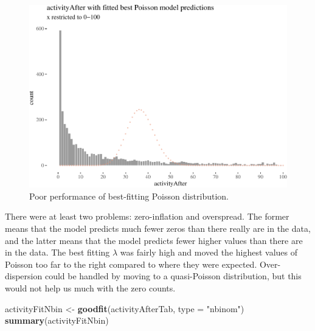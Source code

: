 \documentclass[10pt,]{scrartcl}
\newenvironment{Shaded}{\begin{snugshade}}{\end{snugshade}}
\newcommand{\KeywordTok}[1]{\textcolor[rgb]{0.13,0.29,0.53}{\textbf{#1}}}
\newcommand{\DataTypeTok}[1]{\textcolor[rgb]{0.13,0.29,0.53}{#1}}
\newcommand{\StringTok}[1]{\textcolor[rgb]{0.31,0.60,0.02}{#1}}
\newcommand{\NormalTok}[1]{#1}
\begin{document}
\normalsize

\begin{figure}

\begin{center}\includegraphics[width=1\linewidth]{redditAnalysisWalkthrough_files/figure-latex/unnamed-chunk-71-1} \end{center}
\caption{Poor performance of best-fitting Poisson distribution.}
\end{figure}

There were at least two problems: zero-inflation and overspread. The
former means that the model predicts much fewer zeros than there really
are in the data, and the latter means that the model predicts fewer
higher values than there are in the data. The best fitting \(\lambda\)
was fairly high and moved the highest values of Poisson too far to the
right compared to where they were expected. Over-dispersion could be
handled by moving to a quasi-Poisson distribution, but this would not
help us much with the zero counts.

\footnotesize

\begin{Shaded}
\begin{Highlighting}[]
\NormalTok{activityFitNbin <-}\StringTok{ }\KeywordTok{goodfit}\NormalTok{(activityAfterTab, }\DataTypeTok{type =} \StringTok{"nbinom"}\NormalTok{)}
\KeywordTok{summary}\NormalTok{(activityFitNbin)}
\end{Highlighting}
\end{Shaded}
\end{document}
